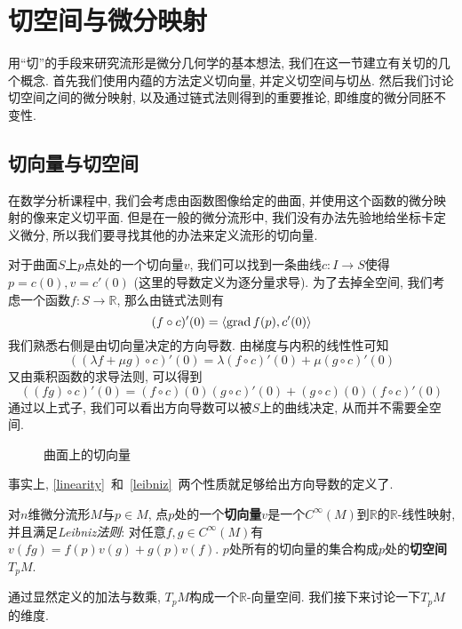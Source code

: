 \section{切空间与微分映射}
用``切''的手段来研究流形是微分几何学的基本想法, 我们在这一节建立有关切的几个概念.
首先我们使用内蕴的方法定义切向量, 并定义切空间与切丛.
然后我们讨论切空间之间的微分映射, 以及通过链式法则得到的重要推论, 即维度的微分同胚不变性.

\subsection*{切向量与切空间}
在数学分析课程中, 我们会考虑由函数图像给定的曲面, 并使用这个函数的微分映射的像来定义切平面.
但是在一般的微分流形中, 我们没有办法先验地给坐标卡定义微分, 所以我们要寻找其他的办法来定义流形的切向量.

对于曲面$S$上$p$点处的一个切向量$v$, 我们可以找到一条曲线$c:I\to S$使得$p=c(0),v=c'(0)$ (这里的导数定义为逐分量求导).
为了去掉全空间, 我们考虑一个函数$f:S\to\mathbb{R}$, 那么由链式法则有
\[(f\circ c)'(0)=\langle\operatorname{grad}{f}(p),c'(0)\rangle\]
我们熟悉右侧是由切向量决定的方向导数.
由梯度与内积的线性性可知
\begin{equation}
    ((\lambda f+\mu g)\circ c)'(0)=\lambda(f\circ c)'(0)+\mu(g\circ c)'(0)\label{linearity}
\end{equation}
又由乘积函数的求导法则, 可以得到
\begin{equation}
    ((fg)\circ c)'(0)=(f\circ c)(0)(g\circ c)'(0)+(g\circ c)(0)(f\circ c)'(0)\label{leibniz}
\end{equation}
通过以上式子, 我们可以看出方向导数可以被$S$上的曲线决定, 从而并不需要全空间.

\begin{figure}[ht]
    \centering
    
    \caption{曲面上的切向量}
\end{figure}

事实上, \eqref{linearity}~和~\eqref{leibniz}~两个性质就足够给出方向导数的定义了.

\begin{defn}
    对$n$维微分流形$M$与$p\in M$, 点$p$处的一个\textbf{切向量}$v$是一个$C^\infty(M)$到$\mathbb{R}$的$\mathbb{R}$-线性映射, 并且满足\textit{Leibniz法则}: 对任意$f,g\in C^\infty(M)$有$v(fg)=f(p)v(g)+g(p)v(f)$.
    $p$处所有的切向量的集合构成$p$处的\textbf{切空间}$T_pM$.
\end{defn}

通过显然定义的加法与数乘, $T_pM$构成一个$\mathbb{R}$-向量空间.
我们接下来讨论一下$T_pM$的维度.

